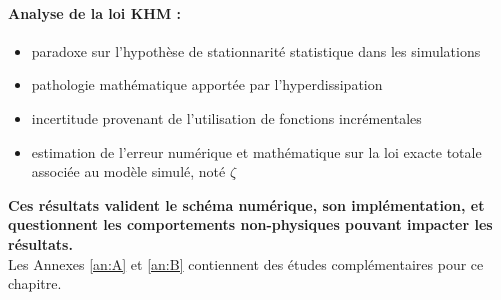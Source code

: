 {\begin{minipage}[c]{\linewidth}
\paragraph{Analyse de la loi \acs{KHM} : }
\begin{itemize}
    \item paradoxe sur l'hypothèse de stationnarité statistique dans les simulations
    \item pathologie mathématique apportée par l'hyperdissipation
    \item incertitude provenant de l'utilisation de fonctions incrémentales
    \item estimation de l'erreur numérique et mathématique sur la loi exacte totale associée au modèle simulé, noté $\zeta$ \\
\end{itemize}

{\bf Ces résultats valident le schéma numérique, son implémentation, et questionnent les comportements non-physiques pouvant impacter les résultats.} \\

Les Annexes \ref{an:A} et \ref{an:B} contiennent des études complémentaires pour ce chapitre.
\end{minipage}}
